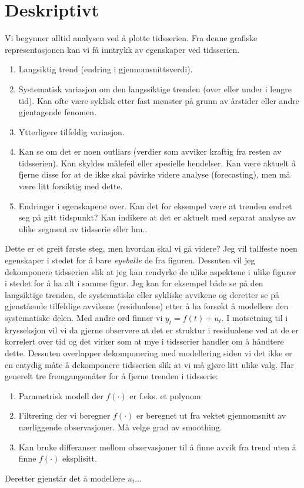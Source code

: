 \section{Deskriptivt}
Vi begynner alltid analysen ved å plotte tidsserien. Fra denne grafiske representasjonen kan vi få inntrykk av egenskaper ved tidsserien.
\begin{enumerate}
\item Langsiktig trend (endring i gjennomsnittsverdi).
\item Systematisk variasjon om den langssiktige trenden (over eller under i lengre tid). Kan ofte være syklisk etter fast mønster på grunn av årstider eller andre gjentagende fenomen.
\item Ytterligere tilfeldig variasjon.
\item Kan se om det er noen outliars (verdier som avviker kraftig fra resten av tidsserien). Kan skyldes målefeil eller spesielle hendelser. Kan være aktuelt å fjerne disse for at de ikke skal påvirke videre analyse (forecasting), men må være litt forsiktig med dette.
\item Endringer i egenskapene over. Kan det for eksempel være at trenden endret seg på gitt tidspunkt? Kan indikere at det er aktuelt med separat analyse av ulike segment av tidsserie eller hm..
\end{enumerate}
Dette er et greit første steg, men hvordan skal vi gå videre? Jeg vil tallfeste noen egenskaper i stedet for å bare \textit{eyeballe} de fra figuren. Dessuten vil jeg dekomponere tidsserien slik at jeg kan rendyrke de ulike aspektene i ulike figurer i stedet for å ha alt i samme figur. Jeg kan for eksempel både se på den langsiktige trenden, de systematiske eller sykliske avvikene og deretter se på gjenstående tilfeldige avvikene (residualene) etter å ha forsøkt å modellere den systematiske delen. Med andre ord finner vi $y_t = f(t)+u_t$. I motsetning til i krysseksjon vil vi da gjerne observere at det er struktur i residualene ved at de er korrelert over tid og det virker som at mye i tidsserier handler om å håndtere dette. Dessuten overlapper dekomponering med modellering siden vi det ikke er en entydig måte å dekomponere tidsserien slik at vi må gjøre litt ulike valg. Har generelt tre fremgangsmåter for å fjerne trenden i tidsserie:
\begin{enumerate}
\item Parametrisk modell der $f(\cdot)$ er f.eks. et polynom
\item Filtrering der vi beregner $f(\cdot)$ er beregnet ut fra vektet gjennomsnitt av nærliggende observasjoner. Må velge grad av smoothing.
\item Kan bruke differanser mellom observasjoner til å finne avvik fra trend uten å finne $f(\cdot)$ eksplisitt.
\end{enumerate}
Deretter gjenstår det å modellere $u_t$...
